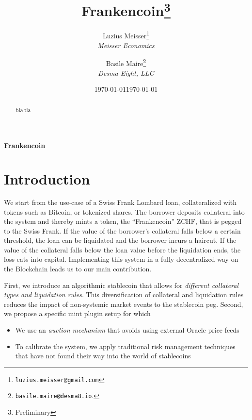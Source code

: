 \documentclass[english,11pt]{article}
\title{Frankencoin\thanks{Preliminary}}
\date{ \today  }
\author{
Luzius Meisser\thanks{\texttt{luzius.meisser@gmail.com}}\\
\emph{Meisser Economics}
\and
Basile Maire\thanks{\texttt{basile.maire@desma8.io}.} \\
\bigskip
\emph{Desma Eight, LLC}

}
\date{\today }
\newcommand{\nothing}[1]{}
\begin{document}
\maketitle
\thispagestyle{empty}


	\newpage
	\thispagestyle{empty}
	
	\vspace{2.5cm}
	
	\thispagestyle{empty}
	
	\vspace{2.5cm}
	\smallskip
	\centerline{\bf {\Large Frankencoin }}
	
	\vspace{.5cm}
	\begin{abstract}
	blabla
	\end{abstract}
	\bigskip
	\bigskip
	
	
	\bigskip
	
	
	\bigskip

	\newpage

	\newpage

\setcounter{page}{1}

\section{Introduction}
We start from the use-case of a Swiss Frank Lombard loan, collateralized with tokens such as Bitcoin, or tokenized shares. The borrower deposits collateral into the system and thereby
mints a token, the ``Frankencoin'' ZCHF, that is pegged to the Swiss Frank. If the value of the borrower's collateral falls below a certain threshold, the loan can be liquidated and the borrower incurs a haircut. If the value of the collateral falls below the loan value before the liquidation ends, the loss eats into capital. Implementing this system in
a fully decentralized way on the Blockchain leads us to our main contribution.

First, we introduce an algorithmic stablecoin that allows for 
\emph{different collateral types and liquidation rules}.
This diversification of collateral and liquidation rules reduces the 
impact of non-systemic market events to the stablecoin peg.
Second, we propose a specific mint plugin setup for which
\begin{itemize}
\item We use an \emph{auction mechanism} that avoids using external Oracle price feeds
\item To calibrate the system, we apply traditional risk management techniques that have not found their way into the world of stablecoins
\end{itemize}
\end{document}
